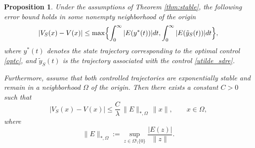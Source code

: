 \documentclass{article}
\newtheorem{proposition}{Proposition}[section]
\begin{document}

\begin{proposition}
Under the assumptions of Theorem \ref{thm:stable}, the following error bound holds in some nonempty neighborhood of the origin
    \begin{equation}
|V_S(x) - V(x)| \leq \max\Bigl\{\int_0^{\infty} |E(y^*(t))| dt, \int_0^{\infty} |E(\tilde{y}_{S}(t))| dt\Bigr\}, 
\label{eq:bound}
\end{equation}
where $y^*(t)$ denotes the state trajectory corresponding to the optimal control \eqref{optc}, and $\tilde{y}_{S}(t)$  is the trajectory associated with the control \eqref{utilde_sdre}.

Furthermore, assume that both controlled trajectories are exponentially stable and remain in a neighborhood $\Omega$ of the origin. Then there exists a constant $C>0$ such that
\begin{equation}
|V_S(x)-V(x)|
\le
\frac{C}{\lambda}\,\|E\|_{*,\Omega}\,\|x\|,
\qquad x\in\Omega,
\label{eq:error_weighted}
\end{equation}
where
\[
\|E\|_{*,\Omega}:=\sup_{z\in\Omega\setminus\{0\}} \frac{|E(z)|}{\|z\|}.
\]



\end{proposition}
\end{document}
